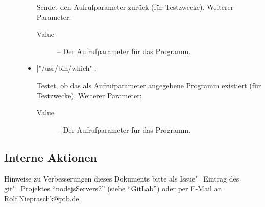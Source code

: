 \documentclass[%
fontsize=11pt
,paper=a4
,twoside
,headings=normal
,pagesize
]{scrartcl}
\begin{document}
\begin{description}
\begin{itemize}
      Sendet den Aufrufparameter zurück (für Testzwecke). Weiterer Parameter:
      \begin{description}

        \item[Value] -- Der Aufrufparameter für das Programm.

      \end{description}

    \item |"/usr/bin/which"|: \par

      Testet, ob das als Aufrufparameter angegebene Programm existiert (für
      Testzwecke). Weiterer Parameter:
      \begin{description}

        \item[Value] -- Der Aufrufparameter für das Programm.

      \end{description}

  \end{itemize}

\end{description}

\subsection*{Interne Aktionen}



\vfill

\begingroup \small \itshape

\noindent Hinweise zu Verbesserungen dieses Dokuments bitte als
Issue"=Eintrag des git"=Projektes "`nodejsServers2"' (siehe "`GitLab"') oder per
E-Mail an \url{Rolf.Niepraschk@ptb.de}.

\endgroup
\end{document}
